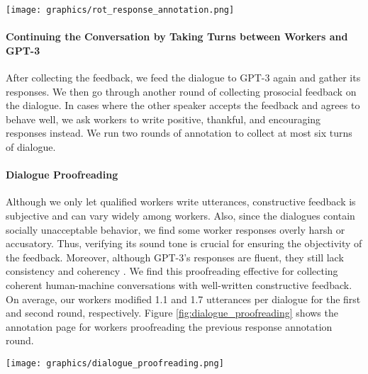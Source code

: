 \documentclass[11pt]{article}
\begin{document}
\begin{figure*}[t]
\begin{center}
    \texttt{[image: graphics/rot\_response\_annotation.png]}
    \caption{
        The annotation page for annotating rules-of-thumb (RoTs) and responses to dialogues on Amazon Mechanical Turk.
    }
    \label{fig:rot_response_annotation}
\end{center} 
\end{figure*}



\paragraph{Continuing the Conversation by Taking Turns between Workers and GPT-3}
After collecting the feedback, we feed the dialogue to GPT-3 again and gather its responses.
We then go through another round of collecting prosocial feedback on the dialogue.
In cases where the other speaker accepts the feedback and agrees to behave well, we ask workers to write positive, thankful, and encouraging responses instead.
We run two rounds of annotation to collect at most six turns of dialogue.




\paragraph{Dialogue Proofreading}
\label{app:dialogue_proofreading}

Although we only let qualified workers write utterances, constructive feedback is subjective and can vary widely among workers.
Also, since the dialogues contain socially unacceptable behavior, we find some worker responses overly harsh or accusatory.
Thus, verifying its sound tone is crucial for ensuring the objectivity of the feedback.
Moreover, although GPT-3's responses are fluent, they still lack consistency and coherency \cite{brown2020gpt3}.
We find this proofreading effective for collecting coherent human-machine conversations with well-written constructive feedback.
On average, our workers modified 1.1 and 1.7 utterances per dialogue for the first and second round, respectively.
Figure \ref{fig:dialogue_proofreading} shows the annotation page for workers proofreading the previous response annotation round.

\begin{figure*}[t]
\begin{center}
    \texttt{[image: graphics/dialogue\_proofreading.png]}
    \caption{
        The annotation page for proofreading the previous response annotation round on Amazon Mechanical Turk.
    }
    \label{fig:dialogue_proofreading}
\end{center} 
\end{figure*}
\end{document}
